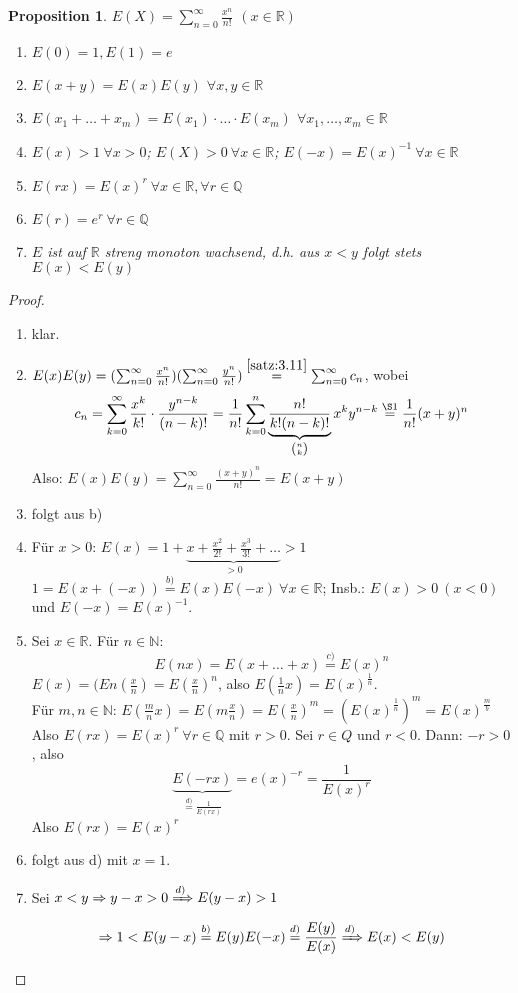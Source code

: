 \documentclass[titlepage,ngerman,a4paper,headsepline,DIV15,halfparskip*,14pt]{scrartcl}
\newcommand{\R}{\mathbb{R}}
\newcommand{\N}{\mathbb{N}}
\newcommand{\Q}{\mathbb{Q}}
\theoremstyle{dotless}
\newtheorem{prop}[satz]{Proposition}
\begin{document}
\begin{prop} \label{prop:3.12-Exponentialfunktion}
	$E(X) = \sum_{n=0}^{\infty} \frac{x^{n}}{n!}$ $(x \in \R)$
	\begin{enumerate}
		\item $E(0) = 1, E(1) = e$
		\item $E(x + y) = E(x) E(y)$ $\forall x, y \in \R$
		\item $E(x_{1} + \dotsc + x_{m}) = E(x_{1}) \cdot \dotsc \cdot E(x_{m})$ $\forall x_{1}, \dotsc, x_{m} \in \R$
		\item $E(x) > 1 ~\forall x > 0$; $E(X) > 0 ~\forall x \in \R$; $E(-x) = E(x)^{-1} ~\forall x \in \R$
		\item $E(rx) = E(x)^{r} ~\forall x \in \R, \forall r \in \Q$
		\item $E(r) = e^{r} ~\forall r \in \Q$
		\item $E$ ist auf $\R$ streng monoton wachsend, d.h. aus $x < y$ folgt stets $E(x) < E(y)$
	\end{enumerate}	
\end{prop}

\begin{proof}
	\begin{enumerate}
		\item klar.
		\item $E(x)E(y) = (\sum_{n=0}^{\infty} \frac{x^{n}}{n!})(\sum_{n=0}^{\infty} \frac{y^{n}}{n!}) \overset{\ref{satz:3.11}}{=} \sum_{n=0}^{\infty} c_{n}$, wobei
			$$ c_{n} = \sum_{k=0}^{\infty} \frac{x^{k}}{k!} \cdot \frac{y^{n-k}}{(n-k)!} = \frac{1}{n!} \sum_{k=0}^{n} \underbrace{\frac{n!}{k! (n-k)!}}_{\binom{n}{k}} x^{k} y^{n-k} \overset{\S1}{=} \frac{1}{n!} (x+y)^{n} $$
			Also: $E(x)E(y) = \sum_{n=0}^{\infty} \frac{(x+y)^{n}}{n!} = E(x+y)$
		\item folgt aus b)
		\item Für $x > 0$: $E(x) = 1 + \underbrace{x + \frac{x^{2}}{2!} + \frac{x^{3}}{3!} + \dotsc}_{> 0} > 1$ \\
			$1 = E\left(x + (-x)\right) \overset{b)}{=} E(x) E(-x) ~\forall x \in \R$; Insb.: $E(x) > 0 ~(x < 0)$ und $E(-x) = E(x)^{-1}$.
		\item Sei $x \in \R$. Für $n \in \N$:
			$$ E(nx) = E(x + \dotsc + x) \overset{c)}{=} E(x)^{n} $$
			$E(x) = (E n(\frac{x}{n}) = E(\frac{x}{n})^{n}$, also $E(\frac{1}{n} x) = E(x)^{\frac{1}{n}}$. \\
			Für $m, n \in \N$:
			$E(\frac{m}{n} x ) = E(m \frac{x}{n}) = E(\frac{x}{n})^{m} = (E(x)^{\frac{1}{n}})^{m} = E(x)^{\frac{m}{b}}$
			Also $E(rx) = E(x)^{r} ~\forall r \in \Q$ mit $r > 0$. Sei $r \in Q$ und $r < 0$. Dann: $-r > 0$, also
			$$ \underbrace{E(-rx)}_{\overset{d)}{=} \frac{1}{E(rx)}} =e(x)^{-r} = \frac{1}{E(x)^{r}} $$
			Also $E(rx) = E(x)^{r}$
		\item folgt aus d) mit $x = 1$.
		\item Sei $x < y \Rightarrow y - x > 0 \xRightarrow[]{d)} E(y - x) > 1$
			$$ \Rightarrow 1 < E(y - x) \overset{b)}{=} E(y)E(-x) \overset{d)}{=} \frac{E(y)}{E(x)} \xRightarrow[]{d)} E(x) < E(y) $$
	\end{enumerate}
\end{proof}
\end{document}
